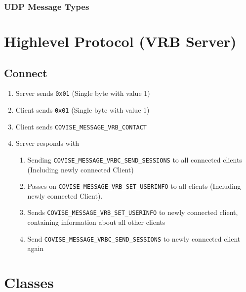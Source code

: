 \subsubsection{UDP Message Types}

\begin{messagetypes}
\end{messagetypes}

\section{Highlevel Protocol (VRB Server)}

\subsection{Connect}

\begin{enumerate}
	\item Server sends \lstinline|0x01| (Single byte with value 1)
	\item Client sends \lstinline|0x01| (Single byte with value 1)
	\item Client sends \lstinline|COVISE_MESSAGE_VRB_CONTACT|
	\item Server responds with 	
	\begin{enumerate}
		\item Sending \lstinline|COVISE_MESSAGE_VRBC_SEND_SESSIONS| to all connected clients (Including newly connected Client)
		\item Passes on \lstinline|COVISE_MESSAGE_VRB_SET_USERINFO| to all clients (Including newly connected Client). 
		\item Sends \lstinline|COVISE_MESSAGE_VRB_SET_USERINFO| to newly connected client, containing information about all other clients
		\item Send \lstinline|COVISE_MESSAGE_VRBC_SEND_SESSIONS| to newly connected client again
	\end{enumerate}
\end{enumerate}


\section{Classes}

